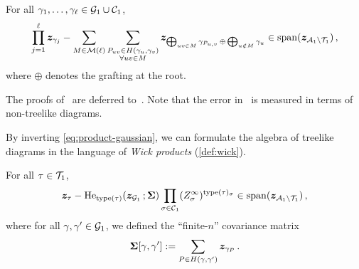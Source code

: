 \begin{lemma}\label{lem:product-gaussian}
    For all $\gamma_1,\ldots,\gamma_\ell\in{\cal G}_1\cup {\cal C}_1$,
    \begin{align}
        \prod_{j=1}^\ell {\bm z}_{\gamma_j} - \sum_{M\in{\cal M}(\ell)} \sum_{\substack{P_{uv}\in H(\gamma_u,\gamma_v)\\\forall uv\in M}} {\bm z}_{\bigoplus_{uv\in M}\gamma_{P_{u,v}} \,\oplus\, \bigoplus_{u\notin M} \gamma_u} \in \operatorname{span}({\bm z}_{{\cal A}_1\setminus {\cal T}_1})\,,\label{eq:product-gaussian}
    \end{align}
    where $\oplus$ denotes the grafting at the root.
\end{lemma}

\noindent The proofs of~ are deferred to~.
Note that the error in~
is measured in terms of
non-treelike diagrams. 

By inverting \cref{eq:product-gaussian},
we can formulate the algebra of treelike diagrams in the language of {\em Wick products} (\cref{def:wick}).

\begin{corollary}\label{lem:treelike-hermite}
    For all $\tau\in{\cal T}_1$,
    \begin{align}
        {\bm z}_{\tau} - \operatorname{He}_{\operatorname{type}(\tau)}({\bm z}_{{\cal G}_1}\,;\bm \Sigma) \prod_{\sigma\in{\cal C}_1} (Z^\infty_{\sigma})^{\operatorname{type}(\tau)_\sigma} \in \operatorname{span}({\bm z}_{{\cal A}_1\setminus {\cal T}_1})\,, \label{eq:reformulated-hermite}
    \end{align}
    where for all $\gamma,\gamma'\in{\cal G}_1$, we defined
    the ``finite-$n$'' covariance matrix
    \begin{align}
        \bm \Sigma[\gamma,\gamma'] := \sum_{P\in H(\gamma, \gamma')} {\bm z}_{\gamma_P}\,.\label{eq:covariance-finite}
    \end{align}
\end{corollary}

